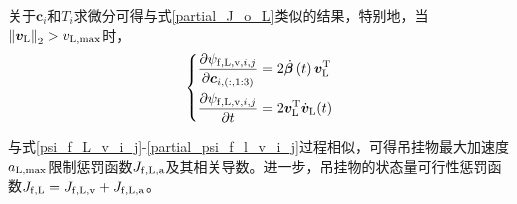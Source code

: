 关于$\boldsymbol{c}_i$和$T_i$求微分可得与式\ref{partial_J_o_L}类似的结果，特别地，当$\left\|\boldsymbol{v}_{\rm{L}}\right\|_2 > v_{\rm{L},\max}$时，
\begin{equation}\label{partial_psi_f_l_v_i_j}
    \left\{\begin{aligned}
        \frac{\partial \psi_{{\rm{f,L,v}},i,j}}{\partial \boldsymbol{c}_{i,(:,1:3)}} &= 2\dot{\boldsymbol{\beta}}\left(t\right) \boldsymbol{v}_{\rm{L}}^{\rm{T}}\\
        \frac{\partial \psi_{{\rm{f,L,v}},i,j}}{\partial t} &= 2\boldsymbol{v}_{\rm{L}}^{\rm{T}}\dot{\boldsymbol{v}}_{\rm{L}}(t)
    \end{aligned}
    \right.
\end{equation}

与式\ref{psi_f_L_v_i_j}-\ref{partial_psi_f_l_v_i_j}过程相似，可得吊挂物最大加速度$a_{\rm{L,max}}$限制惩罚函数$J_{\rm{f,L,a}}$及其相关导数。进一步，吊挂物的状态量可行性惩罚函数$J_{\rm{f,L}} = J_{\rm{f,L,v}} + J_{\rm{f,L,a}}$。


